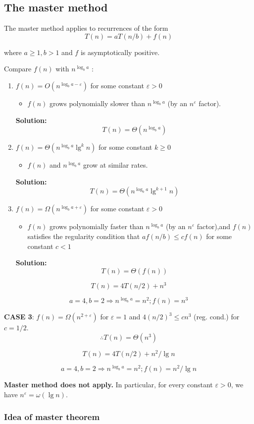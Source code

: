 \documentclass[11pt]{elegantbook}
\begin{document}
\subsection{The master method}
The master method applies to recurrences of the form
$$
T(n)=a T(n / b)+f(n)
$$

where $a \geq 1, b>1$ and $f$ is asymptotically positive.
\begin{theorem}
  Compare $f(n)$ with $n^{\log _{b} a}$ :
  \begin{enumerate}
    \item $f(n)=O\left(n^{\log _{b} a-\varepsilon}\right)$ for some constant $\varepsilon>0$
    \begin{itemize}
      \item $f(n)$ grows polynomially slower than $n^{\log _{b} a}$ (by an $n^{\varepsilon}$ factor).
    \end{itemize}
    \textbf{Solution:}$$
    T(n)=\Theta\left(n^{\log _{b} a}\right)
    $$
    \item $f(n)=\Theta\left(n^{\log _{b} a} \lg ^{k} n\right)$ for some constant $k \geq 0$
    \begin{itemize}
      \item $f(n)$ and $n^{\log _{b} a}$ grow at similar rates.
    \end{itemize}
    \textbf{Solution:}
    $$
    T(n)=\Theta\left(n^{\log _{b} a} \lg ^{k+1} n\right)
    $$
    \item $f(n)=\Omega\left(n^{\log _{b} a+\varepsilon}\right)$ for some constant $\varepsilon>0$
    \begin{itemize}
      \item $f(n)$ grows polynomially faster than $n^{\log _{b} a}$ (by an $n^{\varepsilon}$ factor),and $f(n)$ satisfies the regularity condition that $a f(n / b) \leq c f(n)$ for some constant $c<1$
    \end{itemize}
    \textbf{Solution:}
    $$
    T(n)=\Theta(f(n))
    $$ 
  \end{enumerate}
\end{theorem}
\begin{example}
  $$
T(n)=4 T(n / 2)+n^{3}
$$
\end{example}
\begin{solution}
  $$a=4, b=2 \Rightarrow n^{\log _{b} a}=n^{2} ; f(n)=n^{3}$$

  \textbf{CASE 3}: $f(n)=\Omega\left(n^{2+\varepsilon}\right)$ for $\varepsilon=1$ and $4(n / 2)^{3} \leq c n^{3}$ (reg. cond.) for $c=1 / 2$.
  $$
\therefore T(n)=\Theta\left(n^{3}\right)
$$
\end{solution}
\begin{example}
  $$
  T(n)=4 T(n / 2)+n^{2} / \lg n
  $$
\end{example}
\begin{solution}
  $$a=4, b=2 \Rightarrow n^{\log _{b} a}=n^{2} ; f(n)=n^{2} / \lg n$$

  \textbf{Master method does not apply.} In particular, for every constant $\varepsilon>0$, we have $n^{\varepsilon}=\omega(\lg n)$.

\end{solution}

\subsubsection{Idea of master theorem}
\end{document}
